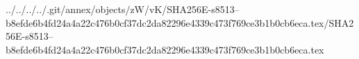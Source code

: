 ../../../../.git/annex/objects/zW/vK/SHA256E-s8513--b8efde6b4fd24a4a22c476b0cf37dc2da82296e4339c473f769ce3b1b0cb6eca.tex/SHA256E-s8513--b8efde6b4fd24a4a22c476b0cf37dc2da82296e4339c473f769ce3b1b0cb6eca.tex